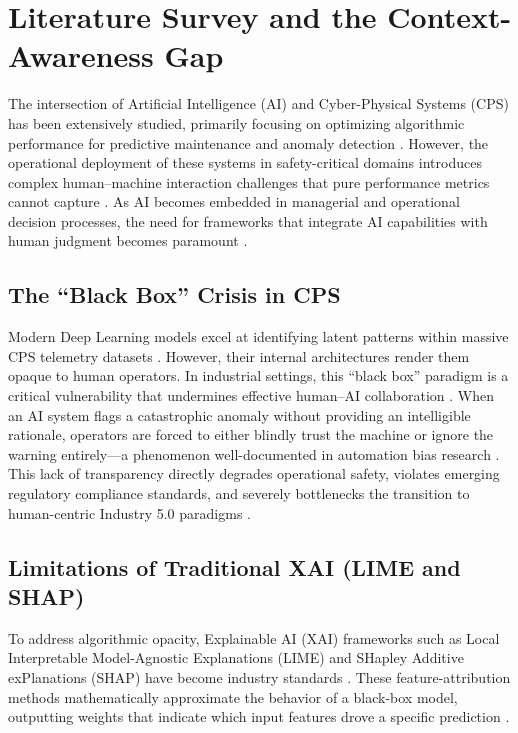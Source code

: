 \documentclass[a4paper,fleqn]{cas-dc}
\begin{document}
\section{Literature Survey and the Context-Awareness Gap}

The intersection of Artificial Intelligence (AI) and Cyber-Physical Systems (CPS) has been extensively studied, primarily focusing on optimizing algorithmic performance for predictive maintenance and anomaly detection \cite{ref3, ref11}. However, the operational deployment of these systems in safety-critical domains introduces complex human--machine interaction challenges that pure performance metrics cannot capture \cite{ref5, ref29}. As AI becomes embedded in managerial and operational decision processes, the need for frameworks that integrate AI capabilities with human judgment becomes paramount \cite{ref_humanai, ref_cognitive_bias}.

\subsection{The ``Black Box'' Crisis in CPS}
Modern Deep Learning models excel at identifying latent patterns within massive CPS telemetry datasets \cite{ref1, ref63}. However, their internal architectures render them opaque to human operators. In industrial settings, this ``black box'' paradigm is a critical vulnerability that undermines effective human--AI collaboration \cite{ref12}. When an AI system flags a catastrophic anomaly without providing an intelligible rationale, operators are forced to either blindly trust the machine or ignore the warning entirely---a phenomenon well-documented in automation bias research \cite{ref_cognitive_bias}. This lack of transparency directly degrades operational safety, violates emerging regulatory compliance standards, and severely bottlenecks the transition to human-centric Industry 5.0 paradigms \cite{ref13, ref38}.

\subsection{Limitations of Traditional XAI (LIME and SHAP)}
To address algorithmic opacity, Explainable AI (XAI) frameworks such as Local Interpretable Model-Agnostic Explanations (LIME) and SHapley Additive exPlanations (SHAP) have become industry standards \cite{ref16, ref26}. These feature-attribution methods mathematically approximate the behavior of a black-box model, outputting weights that indicate which input features drove a specific prediction \cite{ref9}.
\end{document}
